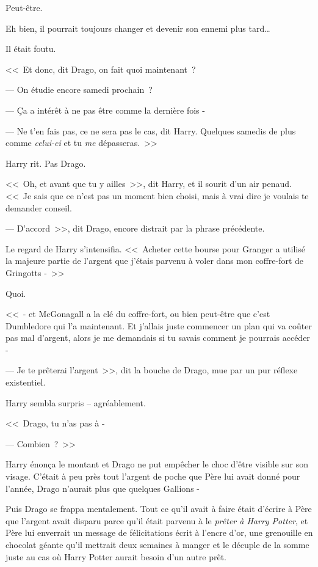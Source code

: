 Peut-être.

Eh bien, il pourrait toujours changer et devenir son ennemi plus tard…

Il était foutu.

<<~Et donc, dit Drago, on fait quoi maintenant~?

--- On étudie encore samedi prochain~?

--- Ça a intérêt à ne pas être comme la dernière fois -

--- Ne t'en fais pas, ce ne sera pas le cas, dit Harry. Quelques samedis de plus comme \emph{celui-ci} et tu \emph{me} dépasseras.~>>

Harry rit. Pas Drago.

<<~Oh, et avant que tu y ailles~>>, dit Harry, et il sourit d'un air penaud. <<~Je sais que ce n'est pas un moment bien choisi, mais à vrai dire je voulais te demander conseil.

--- D'accord~>>, dit Drago, encore distrait par la phrase précédente.

Le regard de Harry s'intensifia. <<~Acheter cette bourse pour Granger a utilisé la majeure partie de l'argent que j'étais parvenu à voler dans mon coffre-fort de Gringotts -~>>

Quoi.

<<~- et McGonagall a la clé du coffre-fort, ou bien peut-être que c'est Dumbledore qui l'a maintenant. Et j'allais juste commencer un plan qui va coûter pas mal d'argent, alors je me demandais si tu savais comment je pourrais accéder -

--- Je te prêterai l'argent~>>, dit la bouche de Drago, mue par un pur réflexe existentiel.

Harry sembla surpris -- agréablement.

<<~Drago, tu n'as pas à -

--- Combien~?~>>

Harry énonça le montant et Drago ne put empêcher le choc d'être visible sur son visage. C'était à peu près tout l'argent de poche que Père lui avait donné pour l'année, Drago n'aurait plus que quelques Gallions -

Puis Drago se frappa mentalement. Tout ce qu'il avait à faire était d'écrire à Père que l'argent avait disparu parce qu'il était parvenu à le \emph{prêter à Harry Potter}, et Père lui enverrait un message de félicitations écrit à l'encre d'or, une grenouille en chocolat géante qu'il mettrait deux semaines à manger et le décuple de la somme juste au cas où Harry Potter aurait besoin d'un autre prêt.

